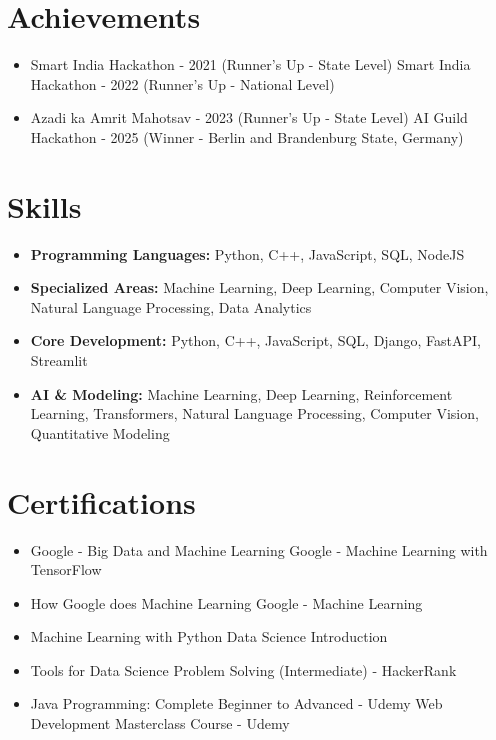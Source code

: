 \documentclass[a4paper,10pt]{article}
\begin{document}
\section*{Achievements}
\begin{itemize}
\item Smart India Hackathon - 2021 (Runner's Up - State Level) \hfill Smart India Hackathon - 2022 (Runner's Up - National Level)
\item Azadi ka Amrit Mahotsav - 2023 (Runner's Up - State Level) \hfill AI Guild Hackathon - 2025 (Winner - Berlin and Brandenburg State, Germany)
\end{itemize}

\section*{Skills}
\begin{itemize}
  \item \textbf{Programming Languages:} Python, C++, JavaScript, SQL, NodeJS
  \item \textbf{Specialized Areas:} Machine Learning, Deep Learning, Computer Vision, Natural Language Processing, Data Analytics
  \item \textbf{Core Development:} Python, C++, JavaScript, SQL, Django, FastAPI, Streamlit
  \item \textbf{AI \& Modeling:} Machine Learning, Deep Learning, Reinforcement Learning, Transformers, Natural Language Processing, Computer Vision, Quantitative Modeling
\end{itemize}

\section*{Certifications}
\begin{itemize}
\item Google - Big Data and Machine Learning \hfill Google - Machine Learning with TensorFlow
\item How Google does Machine Learning \hfill Google - Machine Learning
\item Machine Learning with Python \hfill Data Science Introduction
\item Tools for Data Science \hfill Problem Solving (Intermediate) - HackerRank
\item Java Programming: Complete Beginner to Advanced - Udemy \hfill Web Development Masterclass Course - Udemy
\end{itemize}
\end{document}
